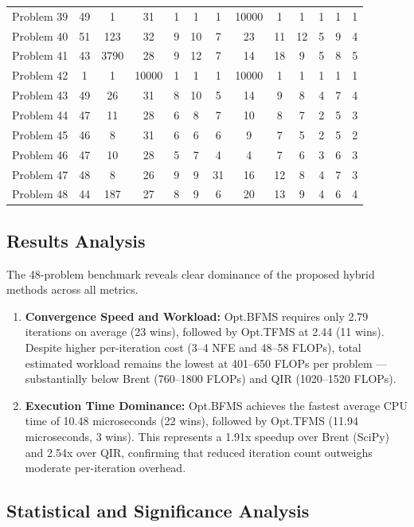 \documentclass[amsmath, amssymb, aps]{revtex4-2}
\begin{document}
\begin{table}
{\begin{tabular}{lcccccccccccc}
Problem 39 & 49 & 1 & 31 & 1 & 1 & 1 & 10000 & 1 & 1 & 1 & 1 & 1  \\
Problem 40 & 51 & 123 & 32 & 9 & 10 & 7 & 23 & 11 & 12 & 5 & 9 & 4  \\
Problem 41 & 43 & 3790 & 28 & 9 & 12 & 7 & 14 & 18 & 9 & 5 & 8 & 5  \\
Problem 42 & 1 & 1 & 10000 & 1 & 1 & 1 & 10000 & 1 & 1 & 1 & 1 & 1  \\
Problem 43 & 49 & 26 & 31 & 8 & 10 & 5 & 14 & 9 & 8 & 4 & 7 & 4  \\
Problem 44 & 47 & 11 & 28 & 6 & 8 & 7 & 10 & 8 & 7 & 2 & 5 & 3  \\
Problem 45 & 46 & 8 & 31 & 6 & 6 & 6 & 9 & 7 & 5 & 2 & 5 & 2  \\
Problem 46 & 47 & 10 & 28 & 5 & 7 & 4 & 4 & 7 & 6 & 3 & 6 & 3  \\
Problem 47 & 48 & 8 & 26 & 9 & 9 & 31 & 16 & 12 & 8 & 4 & 7 & 3  \\
Problem 48 & 44 & 187 & 27 & 8 & 9 & 6 & 20 & 13 & 9 & 4 & 6 & 4  \\
\hline
\end{tabular}}
\end{table}
\FloatBarrier

\subsection{Results Analysis}

The 48-problem benchmark reveals clear dominance of the proposed hybrid methods across all metrics.

\begin{enumerate}
    \item \textbf{Convergence Speed and Workload:} Opt.BFMS requires only 2.79 iterations on average (23 wins), followed by Opt.TFMS at 2.44 (11 wins). Despite higher per-iteration cost (3–4 NFE and 48–58 FLOPs), total estimated workload remains the lowest at 401–650 FLOPs per problem — substantially below Brent (760–1800 FLOPs) and QIR (1020–1520 FLOPs).
    \item \textbf{Execution Time Dominance:} Opt.BFMS achieves the fastest average CPU time of 10.48 microseconds (22 wins), followed by Opt.TFMS (11.94 microseconds, 3 wins). This represents a 1.91x speedup over Brent (SciPy) and 2.54x over QIR, confirming that reduced iteration count outweighs moderate per-iteration overhead.
\end{enumerate}

\subsection{Statistical and Significance Analysis}
\end{document}
